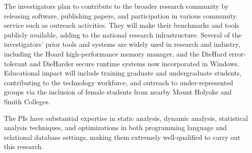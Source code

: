 
The investigators plan to contribute to the broader research community
by releasing software, publishing papers, and participation in various
community service such as outreach activities.  They will make their
benchmarks and tools publicly available, adding to the national
research infrastructure. Several of the investigators' prior tools and
systems are widely used in research and industry, including the Hoard
high-performance memory manager, and the DieHard error-tolerant and
DieHarder secure runtime systems now incorporated in
Windows. Educational impact will include training graduate and
undergraduate students, contributing to the technology workforce, and
outreach to under-represented groups via the inclusion of female
students from nearby Mount Holyoke and Smith Colleges.

The PIs have substantial expertise in static analysis, dynamic
analysis, statistical analysis techniques, and optimizations in both
programming language and relational database settings, making them
extremely well-qualified to carry out this research.

